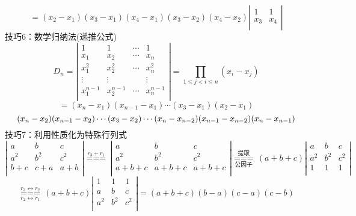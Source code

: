 $$
=({{x}_{2}}-{{x}_{1}})({{x}_{3}}-{{x}_{1}})({{x}_{4}}-{{x}_{1}})({{x}_{3}}-{{x}_{2}})({{x}_{4}}-{{x}_{2}})\left| \begin{matrix}
1 & 1  \\
{{x}_{3}} & {{x}_{4}}  \\
\end{matrix} \right| 
$$
{\color{blue}技巧6：}数学归纳法(递推公式)
$$
D_{n}=\left| \begin{matrix}
1 & 1 & \cdots  & 1  \\
{{x}_{1}} & {{x}_{2}} & \cdots  & {{x}_{n}}  \\
x_{1}^{2} & x_{2}^{2} & \cdots  & x_{n}^{2}  \\
\vdots  & \vdots  & {} & \vdots   \\
x_{1}^{n-1} & x_{2}^{n-1} & \cdots  & x_{n}^{n-1}  \\
\end{matrix} \right|
=\prod\limits_{1\le j<i\le n}{({{x}_{i}}-{{x}_{j}})} 
$$
$$
=({{x}_{n}}-{{x}_{1}})({{x}_{n-1}}-{{x}_{1}})\cdots({{x}_{3}}-{{x}_{1}})({{x}_{2}}-{{x}_{1}})
$$$$
({{x}_{n}}-{{x}_{2}})({{x}_{n-1}}-{{x}_{2}})\cdots 
({{x}_{3}}-{{x}_{2}}) \cdots
({{x}_{n}}-{{x}_{n-2}})({{x}_{n-1}}-{{x}_{n-2}}) \\ 
({{x}_{n}}-{{x}_{n-1}}) \\ 
$$  
{\color{blue}技巧7：}利用性质化为特殊行列式
$$
\left| \begin{matrix}
a & b & c  \\
{{a}^{2}} & {{b}^{2}} & {{c}^{2}}  \\
b+c & c+a & a+b  \\
\end{matrix} \right|
\overset{{{r}_{3}}+{{r}_{1}}}{\mathop{===}}\,\left| \begin{matrix}
a & b & c  \\
{{a}^{2}} & {{b}^{2}} & {{c}^{2}}  \\
a+b+c & a+b+c & a+b+c  \\
\end{matrix} \right|
\underset{\mbox{公因子}}{\overset{\mbox{提取}}{\mathop{===}}}\,(a+b+c)\left| \begin{matrix}
a & b & c  \\
{{a}^{2}} & {{b}^{2}} & {{c}^{2}}  \\
1 & 1 & 1  \\
\end{matrix} \right|
$$$$
\underset{{{r}_{2}}\leftrightarrow{{r}_{1}}}{\overset{{{r}_{3}}\leftrightarrow {{r}_{2}}}{\mathop{===}}}\,(a+b+c)\left| \begin{matrix}
1 & 1 & 1  \\
a & b & c  \\
{{a}^{2}} & {{b}^{2}} & {{c}^{2}}  \\
\end{matrix} \right|
=(a+b+c)(b-a)(c-a)(c-b)
$$
